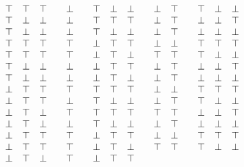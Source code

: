 \begin{myproof}
\begin{nlist}
\[\begin{array}{c c c c c c c c c c c c c c c c c c}
                 & \top & \top & \top & 
                 & \bot &  & \top & \bot & \bot & 
                 & \bot & \top &  & \top & \bot & \bot &  \\
                 & \top & \bot & \bot & 
                 & \bot &  & \top & \top & \top & 
                 & \bot & \top &  & \bot & \bot & \top &  \\
                 & \top & \bot & \bot & 
                 & \bot &  & \top & \bot & \bot & 
                 & \bot & \top &  & \bot & \bot & \bot &  \\
                 & \top & \top & \top & 
                 & \top &  & \bot & \top & \top & 
                 & \bot & \bot &  & \top & \top & \top &  \\
                 & \top & \top & \top & 
                 & \top &  & \bot & \top & \bot & 
                 & \top & \top &  & \top & \bot & \bot &  \\
                 & \top & \bot & \bot & 
                 & \bot &  & \bot & \top & \top & 
                 & \bot & \top &  & \bot & \bot & \top &  \\
                 & \top & \bot & \bot & 
                 & \bot &  & \bot & \top & \bot & 
                 & \bot & \top &  & \bot & \bot & \bot &  \\
                 & \bot & \top & \top & 
                 & \top &  & \top & \top & \top & 
                 & \bot & \bot &  & \top & \top & \top &  \\
                 & \bot & \top & \top & 
                 & \bot &  & \top & \bot & \bot & 
                 & \bot & \top &  & \top & \bot & \bot &  \\
                 & \bot & \top & \bot & 
                 & \top &  & \top & \top & \top & 
                 & \top & \top &  & \bot & \bot & \top &  \\
                 & \bot & \top & \bot & 
                 & \bot &  & \top & \bot & \bot & 
                 & \bot & \top &  & \bot & \bot & \bot &  \\
                 & \bot & \top & \top & 
                 & \top &  & \bot & \top & \top & 
                 & \bot & \bot &  & \top & \top & \top &  \\
                 & \bot & \top & \top & 
                 & \top &  & \bot & \top & \bot & 
                 & \top & \top &  & \top & \bot & \bot &  \\
                 & \bot & \top & \bot & 
                 & \top &  & \bot & \top & \top & 

\end{array}\]
\end{nlist}
\end{myproof}
